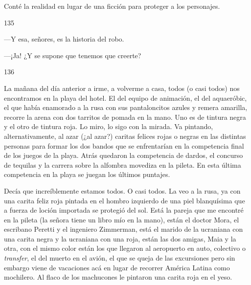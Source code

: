 \documentclass[12pt,twoside,openright,a5paper]{book}
\begin{document}
\nopagebreak

\vspace{0.5cm}

\nopagebreak

Conté la realidad en lugar de una ficción para proteger a los personajes.

\vspace{0.5cm}

\hrulefill \hspace{0.1cm}\decofourleft\hspace{0.2cm} 135 \hspace{0.2cm}\decofourright \hspace{0.1cm}\hrulefill

\nopagebreak

\vspace{0.5cm}

\nopagebreak

---Y esa, señores, es la historia del robo.

---¡Ja! ¿Y se supone que tenemos que creerte?

\vspace{0.5cm}

\hrulefill \hspace{0.1cm}\decofourleft\hspace{0.2cm} 136 \hspace{0.2cm}\decofourright \hspace{0.1cm}\hrulefill

\nopagebreak

\vspace{0.5cm}

\nopagebreak

La mañana del día anterior a irme, a volverme a casa, todos (o casi todos)
nos encontramos en la playa del hotel. El del equipo de animación, el
del aquaeróbic, el que había enamorado a la rusa con sus pantaloncitos
azules y remera amarilla, recorre la arena con dos tarritos de pomada en la
mano. Uno es de tintura negra y el otro de tintura roja. Lo miro, lo sigo
con la mirada. Va pintando, alternativamente, al azar (¿al azar?) caritas
felices rojas o negras en las distintas personas para formar los dos bandos
que se enfrentarían en la competencia final de los juegos de la playa. Atrás
quedaron la competencia de dardos, el concurso de tequilas y la carrera
sobre la alfombra movediza en la pileta. En esta última competencia en la
playa se juegan los últimos puntajes.

Decía que increíblemente estamos todos. O casi todos. La veo a la rusa,
ya con una carita feliz roja pintada en el hombro izquierdo de una piel
blanquísima que a fuerza de loción importada se protegió del sol. Está
la pareja que me encontré en la pileta (la señora tiene un libro mío
en la mano), están el doctor Mora, el escribano Peretti y el ingeniero
Zimmerman, está el marido de la ucraniana con una carita negra y la
ucraniana con una roja, están las dos amigas, Maia y la otra, con el mismo
color están los que llegaron al aeropuerto en auto, colectivo o \emph{transfer},
el del muerto en el avión, el que se queja de las excursiones pero sin
embargo viene de vacaciones acá en lugar de recorrer América Latina como
mochilero. Al flaco de los machucones le pintaron una carita roja en el
yeso. 
\end{document}
